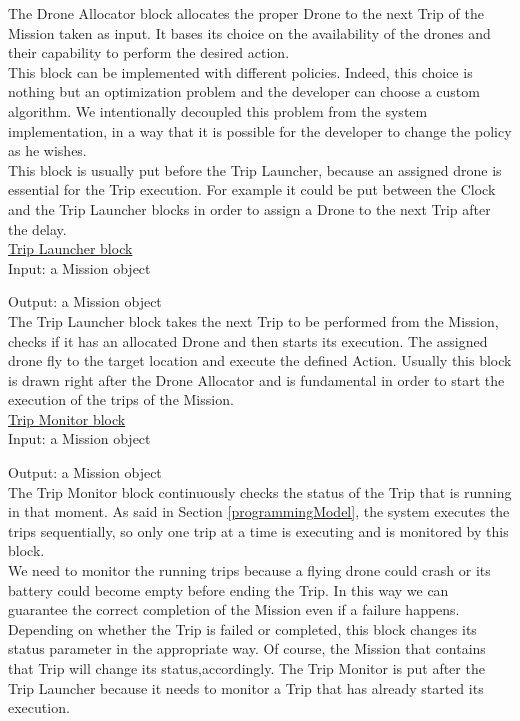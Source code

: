 The Drone Allocator block allocates the proper Drone to the next Trip of the Mission taken as input.
It bases its choice on the availability of the drones and their capability to perform the desired action.
\\
This block can be implemented with different policies. Indeed, this choice is nothing but an optimization problem and the developer can choose a custom algorithm. 
We intentionally decoupled this problem from the system implementation, in a way that it is possible for the developer to change the policy as he wishes.
\\
This block is usually put before the Trip Launcher, because an assigned drone is essential for the Trip execution.
For example it could be put between the Clock and the Trip Launcher blocks in order to assign a Drone to the next Trip after the delay.
\\

\underline{Trip Launcher block}
\\

Input: a Mission object

Output: a Mission object
\\

The Trip Launcher block takes the next Trip to be performed from the Mission, checks if it has an allocated Drone and then starts its execution.
The assigned drone fly to the target location and execute the defined Action.
Usually this block is drawn right after the Drone Allocator and is fundamental in order to start the execution of the trips of the Mission.
\\

\underline{Trip Monitor block}
\\

Input: a Mission object

Output: a Mission object
\\

The Trip Monitor block continuously checks the status of the Trip that is running in that moment. As said in Section \ref{programmingModel}, the system executes the trips sequentially, so only one trip at a time is executing and is monitored by this block. 
\\
We need to monitor the running trips because a flying drone could crash or  its battery could become empty before ending the Trip. 
In this way we can guarantee the correct completion of the Mission even if a failure happens.
\\
Depending on whether the Trip is failed or completed, this block changes its status parameter in the appropriate way.
Of course, the Mission that contains that Trip will change its status,accordingly.
The Trip Monitor is put after the Trip Launcher because it needs to monitor a Trip that has already started its execution.
\\

